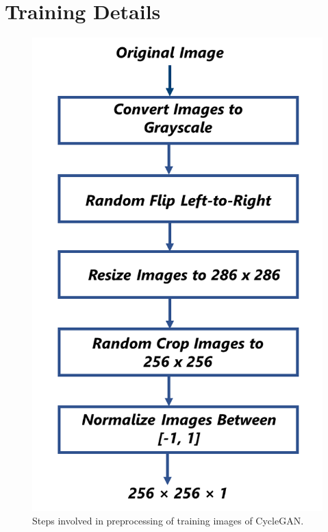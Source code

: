 \section{Training Details}\label{TrainingDetails}


\begin{figure}[H]
        \begin{center}
	    \includegraphics[scale=0.35]{images/Preprocessing.png}
	    \caption[Steps involved in preprocessing of training images of \ac{CycleGAN}.]{Steps involved in preprocessing of training images of \ac{CycleGAN}.}
	    \label{fig:Preprocessing}
	    \end{center}
\end{figure}

